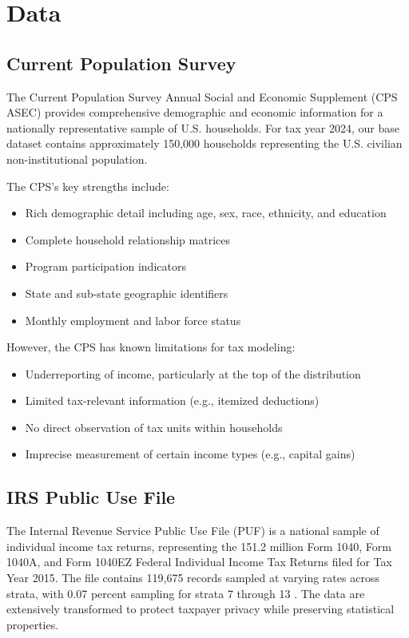 \section{Data}\label{sec:data}

\subsection{Current Population Survey}

The Current Population Survey Annual Social and Economic Supplement (CPS ASEC) provides comprehensive demographic and economic information for a nationally representative sample of U.S. households. For tax year 2024, our base dataset contains approximately 150,000 households representing the U.S. civilian non-institutional population.

The CPS's key strengths include:
\begin{itemize}
    \item Rich demographic detail including age, sex, race, ethnicity, and education
    \item Complete household relationship matrices
    \item Program participation indicators
    \item State and sub-state geographic identifiers
    \item Monthly employment and labor force status
\end{itemize}

However, the CPS has known limitations for tax modeling:
\begin{itemize}
    \item Underreporting of income, particularly at the top of the distribution
    \item Limited tax-relevant information (e.g., itemized deductions)
    \item No direct observation of tax units within households
    \item Imprecise measurement of certain income types (e.g., capital gains)
\end{itemize}

\subsection{IRS Public Use File}

The Internal Revenue Service Public Use File (PUF) is a national sample of individual income tax returns, representing the 151.2 million Form 1040, Form 1040A, and Form 1040EZ Federal Individual Income Tax Returns filed for Tax Year 2015. The file contains 119,675 records sampled at varying rates across strata, with 0.07 percent sampling for strata 7 through 13 \cite{bryant2022}. The data are extensively transformed to protect taxpayer privacy while preserving statistical properties.

